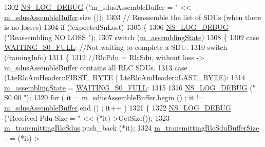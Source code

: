 \begin{DoxyCode}
1302   \hyperlink{group__logging_ga413f1886406d49f59a6a0a89b77b4d0a}{NS\_LOG\_DEBUG} (\textcolor{stringliteral}{"m\_sdusAssembleBuffer = "} << \hyperlink{classns3_1_1LteRlcAm_a075262ee7d8d49e97ab0c48b5e763bf1}{m\_sdusAssembleBuffer}.size ());
1303  \textcolor{comment}{// Reassemble the list of SDUs (when there is no losses)}
1304   \textcolor{keywordflow}{if} (!expectedSnLost)
1305     \{
1306       \hyperlink{group__logging_ga413f1886406d49f59a6a0a89b77b4d0a}{NS\_LOG\_DEBUG} (\textcolor{stringliteral}{"Reassembling NO LOSS "});
1307       \textcolor{keywordflow}{switch} (\hyperlink{classns3_1_1LteRlcAm_ab6d2954b419df60fc8f8df012fa2709c}{m\_assemblingState})
1308         \{
1309           \textcolor{keywordflow}{case} \hyperlink{classns3_1_1LteRlcAm_a43eeebdccf778e2247c956481ed03d62a832e01ad620b816d8bc1fe1b3fea8708}{WAITING\_S0\_FULL}: \textcolor{comment}{//Not waiting to complete a SDU.}
1310                   \textcolor{keywordflow}{switch} (framingInfo)
1311                     \{
1312                       \textcolor{comment}{//RlcPdu = RlcSdu, without loss -> m\_sdusAssembleBuffer contains all RLC SDUs.}
1313                       \textcolor{keywordflow}{case} (\hyperlink{classns3_1_1LteRlcAmHeader_af42d22f1202bd0d8fa1f4cd0494b8b29a3b7a1fc289b74db76f2e76194d289a24}{LteRlcAmHeader::FIRST\_BYTE} | 
      \hyperlink{classns3_1_1LteRlcAmHeader_af0fb4ccf208128c7cf9dcabf02593749afae5968023949559fdf8d8ad9feb81cd}{LteRlcAmHeader::LAST\_BYTE}):
1314                               \hyperlink{classns3_1_1LteRlcAm_ab6d2954b419df60fc8f8df012fa2709c}{m\_assemblingState} = 
      \hyperlink{classns3_1_1LteRlcAm_a43eeebdccf778e2247c956481ed03d62a832e01ad620b816d8bc1fe1b3fea8708}{WAITING\_S0\_FULL};
1315 
1316                               \hyperlink{group__logging_ga413f1886406d49f59a6a0a89b77b4d0a}{NS\_LOG\_DEBUG} (\textcolor{stringliteral}{" S0 00 "});
1320                               \textcolor{keywordflow}{for} ( it = \hyperlink{classns3_1_1LteRlcAm_a075262ee7d8d49e97ab0c48b5e763bf1}{m\_sdusAssembleBuffer}.begin () ; it != 
      \hyperlink{classns3_1_1LteRlcAm_a075262ee7d8d49e97ab0c48b5e763bf1}{m\_sdusAssembleBuffer}.end () ; it++ )
1321                                 \{
1322                                   \hyperlink{group__logging_ga413f1886406d49f59a6a0a89b77b4d0a}{NS\_LOG\_DEBUG} (\textcolor{stringliteral}{"Received Pdu Size = "} << (*it)->GetSize());
1323                                   \hyperlink{classns3_1_1LteRlcAm_a941fac42e27a28f35b0eea1a02c0595f}{m\_transmittingRlcSdus}.push\_back (*it);
1324                                   \hyperlink{classns3_1_1LteRlcAm_a27351db62caae50aabc6b23636a5e0dc}{m\_transmittingRlcSduBufferSize} += (*it)->

\end{DoxyCode}
